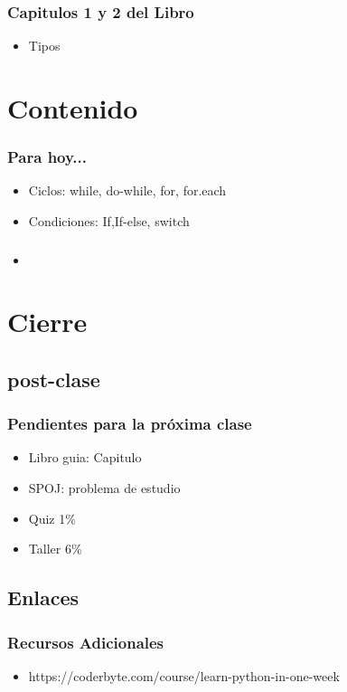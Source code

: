 \documentclass[xcolor=svgnames]{beamer}
\theoremstyle{example}
\begin{document}
\begin{frame}
  \frametitle{Capitulos 1 y 2 del Libro}
  \begin{itemize}
    \item Tipos
  \end{itemize}
\end{frame}

\section{Contenido}

\begin{frame}
  \frametitle{Para hoy...}
\begin{itemize}
\item Ciclos: while, do-while, for, for.each
\item Condiciones: If,If-else, switch
\end{itemize}
\end{frame}

\begin{frame}
  \frametitle{}
  \begin{itemize}
  \item  
  \end{itemize}
\end{frame}

\section{Cierre}
\subsection{post-clase}

\begin{frame}
  \frametitle{Pendientes para la próxima clase}
  \begin{itemize}
  \item{Libro guia: Capitulo }
    \item{SPOJ: problema de estudio}
  \item{Quiz 1\%}
  \item{Taller 6\%}
  \end{itemize}
\end{frame}

\subsection{Enlaces}
\begin{frame}
  \frametitle{Recursos Adicionales}
  \begin{itemize}
  \item https://coderbyte.com/course/learn-python-in-one-week
  \end{itemize}
\end{frame}
\end{document}
